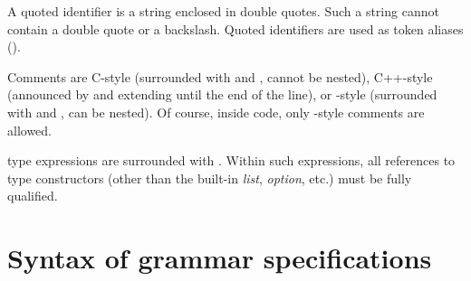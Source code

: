 \documentclass[onecolumn,11pt,nocopyrightspace,preprint]{sigplanconf}
\begin{document}
A quoted identifier  is a string enclosed in double quotes.
Such a string cannot contain a double quote or a backslash.
Quoted identifiers are used as token aliases ().

Comments are C-style (surrounded with \kw{/*} and \kw{*/}, cannot be nested),
C++-style (announced by \kw{/$\!$/} and extending until the end of the line), or
\ocaml-style (surrounded with \kw{(*} and \kw{*)}, can be nested). Of course,
inside \ocaml code, only \ocaml-style comments are allowed.

\ocaml type expressions are surrounded with . Within such expressions,
all references to type constructors (other than the built-in \textit{list}, \textit{option}, etc.)
must be fully qualified.


\section{Syntax of grammar specifications}

\newcommand{\modifier}{(\,\dquestion \metachoice \dplus \metachoice \dstar\hspace{-.3mm})}
\end{document}
